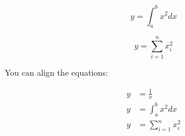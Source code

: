 \begin{equation}
    y=\int_{a}^{b} x^2 dx
\end{equation}

\begin{equation}
    y=\sum_{i=1}^{n} x_i^2
\end{equation}

You can align the equations:

\begin{align}
    y &=\frac{1}{x} \\
    y &=\int_{a}^{b} x^2 dx \\
    y &=\sum_{i=1}^{n} x_i^2
\end{align}